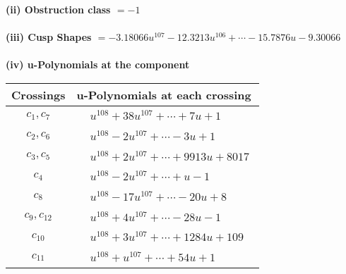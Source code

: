 \documentclass[1p]{elsarticle_modified}
\theoremstyle{definition}
\begin{document}
\flushleft \textbf{(ii) Obstruction class $= -1$}\\~\\
\flushleft \textbf{(iii) Cusp Shapes $= -3.18066 u^{107}-12.3213 u^{106}+\cdots-15.7876 u-9.30066$}\\~\\
\newpage\renewcommand{\arraystretch}{1}
\flushleft \textbf{(iv) u-Polynomials at the component}\newline \\
\begin{tabular}{m{50pt}|m{274pt}}
Crossings & \hspace{64pt}u-Polynomials at each crossing \\
\hline $$\begin{aligned}c_{1},c_{7}\end{aligned}$$&$\begin{aligned}
&u^{108}+38 u^{107}+\cdots+7 u+1
\end{aligned}$\\
\hline $$\begin{aligned}c_{2},c_{6}\end{aligned}$$&$\begin{aligned}
&u^{108}-2 u^{107}+\cdots-3 u+1
\end{aligned}$\\
\hline $$\begin{aligned}c_{3},c_{5}\end{aligned}$$&$\begin{aligned}
&u^{108}+2 u^{107}+\cdots+9913 u+8017
\end{aligned}$\\
\hline $$\begin{aligned}c_{4}\end{aligned}$$&$\begin{aligned}
&u^{108}-2 u^{107}+\cdots+u-1
\end{aligned}$\\
\hline $$\begin{aligned}c_{8}\end{aligned}$$&$\begin{aligned}
&u^{108}-17 u^{107}+\cdots-20 u+8
\end{aligned}$\\
\hline $$\begin{aligned}c_{9},c_{12}\end{aligned}$$&$\begin{aligned}
&u^{108}+4 u^{107}+\cdots-28 u-1
\end{aligned}$\\
\hline $$\begin{aligned}c_{10}\end{aligned}$$&$\begin{aligned}
&u^{108}+3 u^{107}+\cdots+1284 u+109
\end{aligned}$\\
\hline $$\begin{aligned}c_{11}\end{aligned}$$&$\begin{aligned}
&u^{108}+u^{107}+\cdots+54 u+1
\end{aligned}$\\
\hline
\end{tabular}\\~\\
\end{document}
